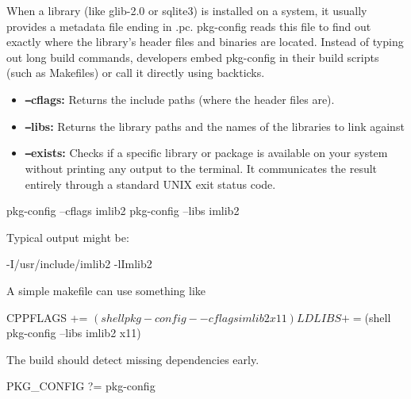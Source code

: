 \documentclass{report}
\begin{document}
\begin{itemize}
            \bigbreak \noindent 
            When a library (like glib-2.0 or sqlite3) is installed on a system, it usually provides a metadata file ending in .pc. pkg-config reads this file to find out exactly where the library's header files and binaries are located.
            \bigbreak \noindent 
            Instead of typing out long build commands, developers embed pkg-config in their build scripts (such as Makefiles) or call it directly using backticks.
            \bigbreak \noindent 
            \begin{itemize}
                \item \textbf{\texttt{--}cflags:} Returns the include paths (where the header files are).
                \item \textbf{\texttt{--}libs:} Returns the library paths and the names of the libraries to link against
                \item \textbf{\texttt{--}exists:} Checks if a specific library or package is available on your system without printing any output to the terminal. It communicates the result entirely through a standard UNIX exit status code.
            \end{itemize}
            \bigbreak \noindent 
            \begin{cppcode}
                pkg-config --cflags imlib2
                pkg-config --libs imlib2
            \end{cppcode}
            \bigbreak \noindent 
            Typical output might be:
            \bigbreak \noindent 
            \begin{cppcode}
                -I/usr/include/imlib2
                -lImlib2
            \end{cppcode}
            \bigbreak \noindent 
            A simple makefile can use something like 
            \bigbreak \noindent 
            \begin{cppcode}
                CPPFLAGS += $(shell pkg-config --cflags imlib2 x11)
                LDLIBS   += $(shell pkg-config --libs imlib2 x11)
            \end{cppcode}
            \bigbreak \noindent 
            The build should detect missing dependencies early.
            \bigbreak \noindent 
            \begin{cppcode}
                PKG_CONFIG ?= pkg-config


\end{cppcode}
\end{itemize}
\end{document}
